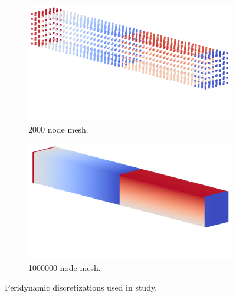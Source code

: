 \documentclass[preprint,12pt]{elsarticle}
\begin{document}
\begin{figure}[tbp] 
    \centering 
    \begin{subfigure}[b]{0.4\textwidth}
        \includegraphics[width=\textwidth]{./figs/mesh2000_replacement.png}
        \caption{2000 node mesh.}
        \label{fig:MCMesh}
    \end{subfigure}
    \begin{subfigure}[b]{0.4\textwidth}
        \includegraphics[width=\textwidth]{./figs/mesh1000000_replacement.png}
        \caption{1000000 node mesh.}
        \label{fig:SCMesh}
    \end{subfigure}
    \caption{Peridynamic discretizations used in study.}
    \label{fig:pd_discrete}
\end{figure}
\end{document}
